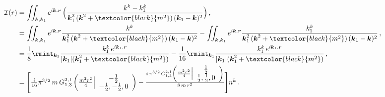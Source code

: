\begin{align}
    \begin{split}
        \mathcal{I}(r)&=\iint_{\boldsymbol{k},\boldsymbol{k}_1}e^{i\boldsymbol{k}.\boldsymbol{r}}\,\Big(\frac{k^k-k_1^k}{\boldsymbol{k}_1^2\,(\boldsymbol{k}^2+\textcolor{black}{m^2})\,(\boldsymbol{k}_1-\boldsymbol{k})^2}\Big)\,,\\ &
    =\iint_{\boldsymbol{k},\boldsymbol{k}_1} e^{i\boldsymbol{k}.\boldsymbol{r}}\frac{k^k}{\boldsymbol{k}_1^2\,(\boldsymbol{k}^2+\textcolor{black}{m^2})\,(\boldsymbol{k}_1-\boldsymbol{k})^2}-\iint_{\boldsymbol{k},\boldsymbol{k}_1} e^{i\boldsymbol{k}.\boldsymbol{r}}\frac{k_1^k}{\boldsymbol{k}_1^2\,(\boldsymbol{k}^2+\textcolor{black}{m^2})\,(\boldsymbol{k}_1-\boldsymbol{k})^2}\,,\\ &
=\frac{1}{8}\rmint_{\boldsymbol{k}_1}\frac{k_1^k \,e^{i\boldsymbol{k}_1.\boldsymbol{r}}}{|\boldsymbol{k}_1|(\boldsymbol{k}_1^2+\textcolor{black}{m^2})}-\frac{1}{16}\rmint_{\boldsymbol{k}_1}\frac{k_1^k \,e^{i\boldsymbol{k}_1.\boldsymbol{r}}}{|\boldsymbol{k}_1|(\boldsymbol{k}_1^2+\textcolor{black}{m^2})}\,,\\ &
=\textstyle{\Bigg[\frac{i}{16} \pi^{3/2}\, m \,G_{1,3}^{2,1}\left(\frac{m^2 r^2}{4}\Big|
\begin{array}{c}
 -\frac{1}{2} \\
 -\frac{1}{2},-\frac{1}{2},0 \\
\end{array}
\right)-\frac{i\,\pi^{3/2}\, G_{1,3}^{2,1}\left(\frac{m^2 r^2}{4}\Big|
\begin{array}{c}
 \frac{1}{2} \\
 \frac{1}{2},\frac{1}{2},0 \\
\end{array}
\right)}{8 \,m\, r^2}\Bigg]n^k}\,.
    \end{split}
\end{align}
